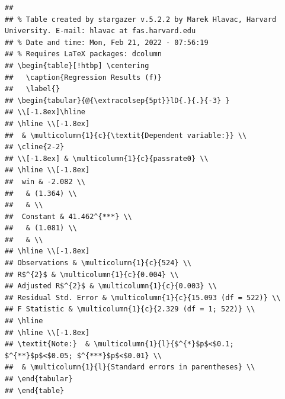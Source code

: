 \documentclass[
  12pt,
  landscape]{article}
\begin{document}
\begin{verbatim}
## 
## % Table created by stargazer v.5.2.2 by Marek Hlavac, Harvard University. E-mail: hlavac at fas.harvard.edu
## % Date and time: Mon, Feb 21, 2022 - 07:56:19
## % Requires LaTeX packages: dcolumn 
## \begin{table}[!htbp] \centering 
##   \caption{Regression Results (f)} 
##   \label{} 
## \begin{tabular}{@{\extracolsep{5pt}}lD{.}{.}{-3} } 
## \\[-1.8ex]\hline 
## \hline \\[-1.8ex] 
##  & \multicolumn{1}{c}{\textit{Dependent variable:}} \\ 
## \cline{2-2} 
## \\[-1.8ex] & \multicolumn{1}{c}{passrate0} \\ 
## \hline \\[-1.8ex] 
##  win & -2.082 \\ 
##   & (1.364) \\ 
##   & \\ 
##  Constant & 41.462^{***} \\ 
##   & (1.081) \\ 
##   & \\ 
## \hline \\[-1.8ex] 
## Observations & \multicolumn{1}{c}{524} \\ 
## R$^{2}$ & \multicolumn{1}{c}{0.004} \\ 
## Adjusted R$^{2}$ & \multicolumn{1}{c}{0.003} \\ 
## Residual Std. Error & \multicolumn{1}{c}{15.093 (df = 522)} \\ 
## F Statistic & \multicolumn{1}{c}{2.329 (df = 1; 522)} \\ 
## \hline 
## \hline \\[-1.8ex] 
## \textit{Note:}  & \multicolumn{1}{l}{$^{*}$p$<$0.1; $^{**}$p$<$0.05; $^{***}$p$<$0.01} \\ 
##  & \multicolumn{1}{l}{Standard errors in parentheses} \\ 
## \end{tabular} 
## \end{table}
\end{verbatim}
\end{document}
